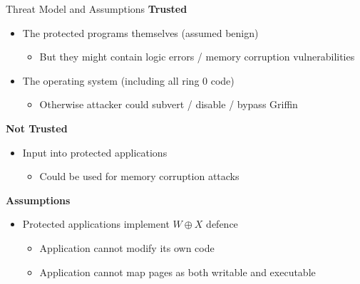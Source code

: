 \documentclass[12pt, dvipsnames, aspectratio=169]{beamer}
\newcommand{\orange}[1]{{\color{orange}#1}}
\newcommand{\blue}[1]{{\color{blue}#1}}
\begin{document}
\begin{frame}[c]{Threat Model and Assumptions}{}
  {\bf \color{blue} Trusted}
  \begin{itemize}
    \item The protected programs themselves (assumed benign)
    \begin{itemize}
      \item But they might contain logic errors / memory corruption vulnerabilities
    \end{itemize}
    \item The operating system (including \blue{all ring 0 code})
    \begin{itemize}
      \item Otherwise attacker could subvert / disable / bypass Griffin
    \end{itemize}
  \end{itemize}

  \vfill
  {\bf \color{orange} Not Trusted}
  \begin{itemize}
    \item Input into protected applications
    \begin{itemize}
      \item Could be used for \orange{memory corruption attacks}
    \end{itemize}
  \end{itemize}

  \vfill
  {\bf \color{green} Assumptions}
  \begin{itemize}
    \item Protected applications implement $W\oplus X$ defence
    \begin{itemize}
      \item Application cannot modify its own code
      \item Application cannot map pages as both writable and executable
    \end{itemize}
  \end{itemize}
\end{frame}
\end{document}
